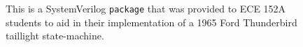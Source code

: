 
\begin{figure}[t]
    \centering
    \small
    \inputminted[frame=single]{systemverilog}{media/code/ece152a_pkg.sv}
    \caption[
        \texttt{package} included in introductory SystemVerilog course
    ]{
        This is a SystemVerilog \texttt{package} that was provided to ECE 152A students to aid in their implementation of a 1965 Ford Thunderbird taillight state-machine.
    }
    \label{fig:ece152a_pkg}
\end{figure}

